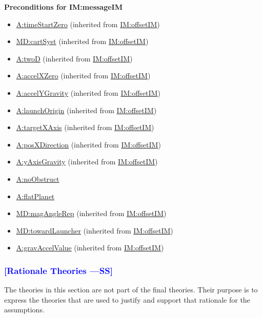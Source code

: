 \documentclass[12pt]{article}
\newcommand{\authornote}[3]{\textcolor{#1}{[#3 ---#2]}}
\newcommand{\authornote}[3]{}
\newcommand{\wss}[1]{\authornote{blue}{SS}{#1}}
\begin{document}
\noindent \textbf{Preconditions for IM:messageIM}
\begin{itemize}
\item \hyperref[timeStartZero]{A:timeStartZero} (inherited from \hyperref[IM:offsetIM]{IM:offsetIM})
\item \hyperref[MD:cartSyst]{MD:cartSyst} (inherited from \hyperref[IM:offsetIM]{IM:offsetIM})
\item \hyperref[twoD]{A:twoD} (inherited from \hyperref[IM:offsetIM]{IM:offsetIM})
\item \hyperref[accelXZero]{A:accelXZero} (inherited from \hyperref[IM:offsetIM]{IM:offsetIM})
\item \hyperref[accelYGravity]{A:accelYGravity} (inherited from \hyperref[IM:offsetIM]{IM:offsetIM})
\item \hyperref[launchOrigin]{A:launchOrigin} (inherited from \hyperref[IM:offsetIM]{IM:offsetIM})
\item \hyperref[targetXAxis]{A:targetXAxis} (inherited from \hyperref[IM:offsetIM]{IM:offsetIM})
\item \hyperref[posXDirection]{A:posXDirection} (inherited from \hyperref[IM:offsetIM]{IM:offsetIM})
\item \hyperref[yAxisGravity]{A:yAxisGravity} (inherited from \hyperref[IM:offsetIM]{IM:offsetIM})
\item \hyperref[noObstruct]{A:noObstruct}
\item \hyperref[flatPlanet]{A:flatPlanet}
\item \hyperref[MD:magAngleRep]{MD:magAngleRep} (inherited from \hyperref[IM:offsetIM]{IM:offsetIM})
\item \hyperref[MD:towardLauncher]{MD:towardLauncher} (inherited from \hyperref[IM:offsetIM]{IM:offsetIM})
\item \hyperref[gravAccelValue]{A:gravAccelValue} (inherited from \hyperref[IM:offsetIM]{IM:offsetIM})

\end{itemize}

\subsubsection{\wss{Rationale Theories}} \label{Sec:RationaleTheories}

The theories in this section are not part of the final theories.  Their purpose
is to express the theories that are used to justify and support that rationale
for the assumptions.
\end{document}
